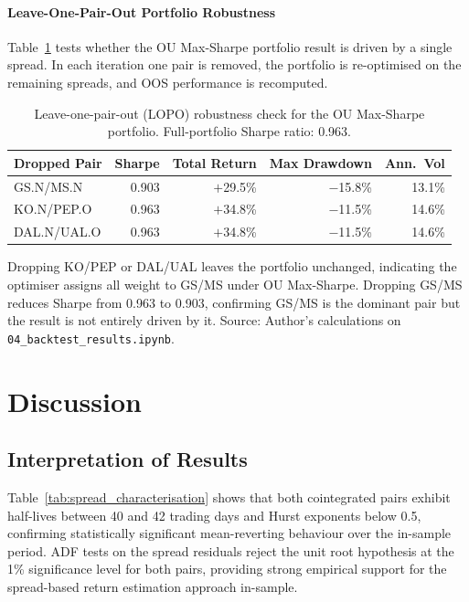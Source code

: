 \documentclass[a4paper]{report}
\begin{document}
\FloatBarrier

\subsubsection{Leave-One-Pair-Out Portfolio Robustness}

Table~\ref{tab:lopo} tests whether the OU Max-Sharpe portfolio result is driven by a
single spread. In each iteration one pair is removed, the portfolio is re-optimised
on the remaining spreads, and OOS performance is recomputed.

\begin{table}[htbp]
\centering
\caption{Leave-one-pair-out (LOPO) robustness check for the OU Max-Sharpe portfolio.
Full-portfolio Sharpe ratio: 0.963.\\}
\label{tab:lopo}
\begin{tabular}{lrrrr}
\toprule
Dropped Pair & Sharpe & Total Return & Max Drawdown & Ann.\ Vol \\
\midrule
GS.N/MS.N   & 0.903 & $+$29.5\% & $-$15.8\% & 13.1\% \\
KO.N/PEP.O  & 0.963 & $+$34.8\% & $-$11.5\% & 14.6\% \\
DAL.N/UAL.O & 0.963 & $+$34.8\% & $-$11.5\% & 14.6\% \\
\bottomrule
\end{tabular}
\par\smallskip
\begin{minipage}{\linewidth}
\small
Dropping KO/PEP or DAL/UAL leaves the portfolio unchanged, indicating the optimiser assigns all weight to GS/MS under OU Max-Sharpe. Dropping GS/MS reduces Sharpe from 0.963 to 0.903, confirming GS/MS is the dominant pair but the result is not entirely driven by it.
Source: Author's calculations on \texttt{04\_backtest\_results.ipynb}.
\end{minipage}
\end{table}

\FloatBarrier

\chapter{Discussion}
\label{chap:discussion}

\section{Interpretation of Results}

Table~\ref{tab:spread_characterisation} shows that both cointegrated pairs exhibit
half-lives between 40 and 42 trading days and Hurst exponents below 0.5, confirming
statistically significant mean-reverting behaviour over the in-sample period. ADF tests
on the spread residuals reject the unit root hypothesis at the 1\% significance level
for both pairs, providing strong empirical support for the spread-based return
estimation approach in-sample.
\end{document}
